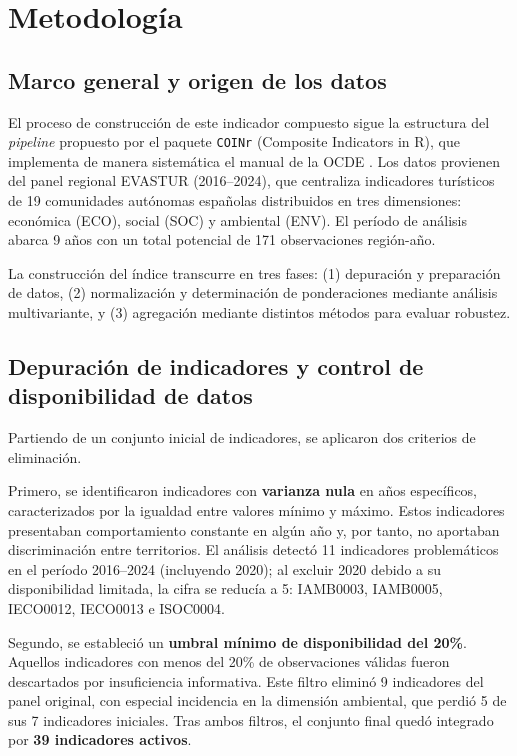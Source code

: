 
\chapter{Metodología}

\section{Marco general y origen de los datos}

El proceso de construcción de este indicador compuesto sigue la estructura del \emph{pipeline} propuesto por el paquete \texttt{COINr} (Composite Indicators in R), que implementa de manera sistemática el manual de la OCDE \citep{oecd2008handbook}. Los datos provienen del panel regional EVASTUR (2016--2024), que centraliza indicadores turísticos de 19 comunidades autónomas españolas distribuidos en tres dimensiones: económica (ECO), social (SOC) y ambiental (ENV). El período de análisis abarca 9 años con un total potencial de 171 observaciones región-año.

La construcción del índice transcurre en tres fases: (1) depuración y preparación de datos, (2) normalización y determinación de ponderaciones mediante análisis multivariante, y (3) agregación mediante distintos métodos para evaluar robustez.

\section{Depuración de indicadores y control de disponibilidad de datos}

Partiendo de un conjunto inicial de indicadores, se aplicaron dos criterios de eliminación.

Primero, se identificaron indicadores con \textbf{varianza nula} en años específicos, caracterizados por la igualdad entre valores mínimo y máximo. Estos indicadores presentaban comportamiento constante en algún año y, por tanto, no aportaban discriminación entre territorios. El análisis detectó 11 indicadores problemáticos en el período 2016--2024 (incluyendo 2020); al excluir 2020 debido a su disponibilidad limitada, la cifra se reducía a 5: IAMB0003, IAMB0005, IECO0012, IECO0013 e ISOC0004.

Segundo, se estableció un \textbf{umbral mínimo de disponibilidad del 20\%}. Aquellos indicadores con menos del 20\% de observaciones válidas fueron descartados por insuficiencia informativa. Este filtro eliminó 9 indicadores del panel original, con especial incidencia en la dimensión ambiental, que perdió 5 de sus 7 indicadores iniciales. Tras ambos filtros, el conjunto final quedó integrado por \textbf{39 indicadores activos}.

